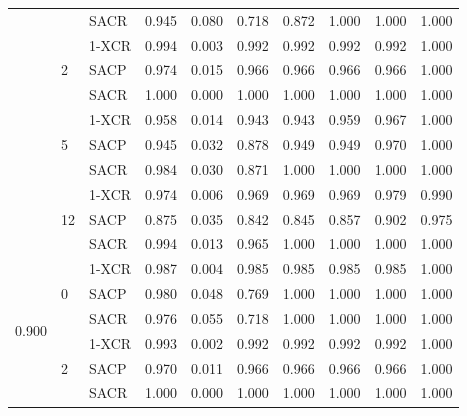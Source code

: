\begin{longtable}[c]{|l|l|l|l|l|l|l|l|l|l|}
                        &                     & SACR   & 0.945 & 0.080 & 0.718 & 0.872 & 1.000 & 1.000 & 1.000 \\ \cline{2-10} 
                        & \multirow{3}{*}{2}  & 1-XCR  & 0.994 & 0.003 & 0.992 & 0.992 & 0.992 & 0.992 & 1.000 \\ \cline{3-10} 
                        &                     & SACP   & 0.974 & 0.015 & 0.966 & 0.966 & 0.966 & 0.966 & 1.000 \\ \cline{3-10} 
                        &                     & SACR   & 1.000 & 0.000 & 1.000 & 1.000 & 1.000 & 1.000 & 1.000 \\ \cline{2-10} 
                        & \multirow{3}{*}{5}  & 1-XCR  & 0.958 & 0.014 & 0.943 & 0.943 & 0.959 & 0.967 & 1.000 \\ \cline{3-10} 
                        &                     & SACP   & 0.945 & 0.032 & 0.878 & 0.949 & 0.949 & 0.970 & 1.000 \\ \cline{3-10} 
                        &                     & SACR   & 0.984 & 0.030 & 0.871 & 1.000 & 1.000 & 1.000 & 1.000 \\ \cline{2-10} 
                        & \multirow{3}{*}{12} & 1-XCR  & 0.974 & 0.006 & 0.969 & 0.969 & 0.969 & 0.979 & 0.990 \\ \cline{3-10} 
                        &                     & SACP   & 0.875 & 0.035 & 0.842 & 0.845 & 0.857 & 0.902 & 0.975 \\ \cline{3-10} 
                        &                     & SACR   & 0.994 & 0.013 & 0.965 & 1.000 & 1.000 & 1.000 & 1.000 \\ \hline
\multirow{12}{*}{0.900} & \multirow{3}{*}{0}  & 1-XCR  & 0.987 & 0.004 & 0.985 & 0.985 & 0.985 & 0.985 & 1.000 \\ \cline{3-10} 
                        &                     & SACP   & 0.980 & 0.048 & 0.769 & 1.000 & 1.000 & 1.000 & 1.000 \\ \cline{3-10} 
                        &                     & SACR   & 0.976 & 0.055 & 0.718 & 1.000 & 1.000 & 1.000 & 1.000 \\ \cline{2-10} 
                        & \multirow{3}{*}{2}  & 1-XCR  & 0.993 & 0.002 & 0.992 & 0.992 & 0.992 & 0.992 & 1.000 \\ \cline{3-10} 
                        &                     & SACP   & 0.970 & 0.011 & 0.966 & 0.966 & 0.966 & 0.966 & 1.000 \\ \cline{3-10} 
                        &                     & SACR   & 1.000 & 0.000 & 1.000 & 1.000 & 1.000 & 1.000 & 1.000 \\ \cline{2-10} 

\end{longtable}
